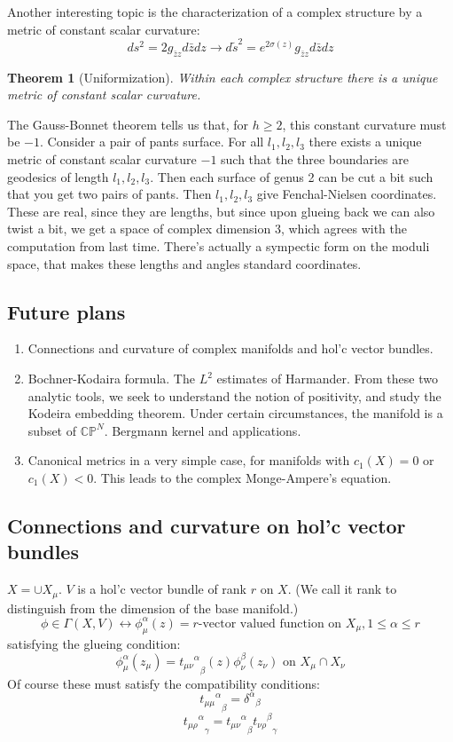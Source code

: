 \documentclass[12 pt]{article}
\theoremstyle{plain}
\newtheorem*{thm*}{Theorem}
\theoremstyle{definition}
\theoremstyle{remark}
\begin{document}
Another interesting topic is the characterization of a complex structure by a metric of constant scalar curvature:
\[       ds^2 = 2 g_{\bar z z} d\bar z dz \to d \tilde s^2 = e^{2 \sigma(z)} g_{\bar z z} d\bar z dz    \]
\begin{thm*} [Uniformization]
Within each complex structure there is a unique metric of constant scalar curvature.
\end{thm*}
The Gauss-Bonnet theorem tells us that, for $h \geq 2$, this constant curvature must be $-1$. Consider a pair of pants surface. For all $l_1, l_2, l_3$ there exists a unique metric of constant scalar curvature $-1$ such that the three boundaries are geodesics of length $l_1, l_2, l_3$. Then each surface of genus 2 can be cut a bit such that you get two pairs of pants. Then $l_1, l_2, l_3$ give Fenchal-Nielsen coordinates. These are real, since they are lengths, but since upon glueing back we can also twist a bit, we get a space of complex dimension 3, which agrees with the computation from last time. There's actually a sympectic form on the moduli space, that makes these lengths and angles standard coordinates.

\subsection*{Future plans}
\begin{enumerate}
\item Connections and curvature of complex manifolds and hol'c vector bundles.
\item Bochner-Kodaira formula. The $L^2$ estimates of Harmander. From these two analytic tools, we seek to understand the notion of positivity, and study the Kodeira embedding theorem. Under certain circumstances, the manifold is a subset of $\mathbb{CP}^N$. Bergmann kernel and applications.
\item Canonical metrics in a very simple case, for manifolds with $c_1(X) = 0$ or $c_1(X) < 0$. This leads to the complex Monge-Ampere's equation.
\end{enumerate}

\subsection*{Connections and curvature on hol'c vector bundles}
$X = \cup X_{\mu}$. $V$ is a hol'c vector bundle of rank $r$ on $X$. (We call it rank to distinguish from the dimension of the base manifold.)
\[        \phi \in \Gamma(X, V) \longleftrightarrow \phi^{\alpha}_{\mu}  (z) = r\text{-vector valued function on } X_{\mu}, 1\leq \alpha \leq r     \]
satisfying the glueing condition:
\[      \phi^{\alpha}_{\mu} (z_{\mu}) = {{t_{\mu \nu}}^{\alpha}}_{\beta}(z) \phi^{\beta}_{\nu} (z_{\nu}) \text{    on } X_{\mu} \cap X_{\nu}     \]
Of course these must satisfy the compatibility conditions:
\[     {{ t_{\mu \mu}}^{\alpha}}_{\beta} = {\delta^{\alpha}}_{\beta}    \]
\[       {{ t_{\mu \rho}}^{\alpha}}_{\gamma} =  {{ t_{\mu \nu}}^{\alpha}}_{\beta}  {{ t_{\nu \rho}}^{\beta}}_{\gamma}     \]
\end{document}
